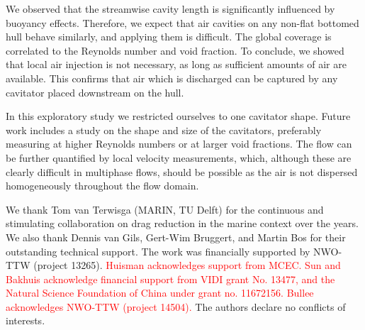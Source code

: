 \documentclass[aps,onecolumn,10pt, floatfix, superscriptaddress,longbibliography, pra]{revtex4-1}
\newcommand{\red}[1]{\textcolor{red}{#1}}
\begin{document}
We observed that the streamwise cavity length is significantly influenced by buoyancy effects. Therefore, we expect that air cavities on any non-flat bottomed hull behave similarly, and applying them is difficult. The global coverage is correlated to the Reynolds number and void fraction. To conclude, we showed that local air injection is not necessary, as long as sufficient amounts of air are available. This confirms that air which is discharged can be captured by any cavitator placed downstream on the hull.

In this exploratory study we restricted ourselves to one cavitator shape. Future work includes a study on the shape and size of the cavitators, preferably measuring at higher Reynolds numbers or at larger void fractions. The flow can be further quantified by local velocity measurements, which, although these are clearly difficult in multiphase flows, should be possible as the air is not dispersed homogeneously throughout the flow domain.

\begin{acknowledgments}
We thank Tom van Terwisga (MARIN, TU Delft) for the continuous and stimulating collaboration on drag reduction in the marine context over the years. We also thank Dennis van Gils, Gert-Wim Bruggert, and Martin Bos for their outstanding technical support. The work was financially supported by NWO-TTW (project 13265). \red{Huisman acknowledges support from MCEC. Sun and Bakhuis acknowledge financial support from VIDI grant No. 13477, and the Natural Science Foundation of China under grant no. 11672156. Bullee acknowledges NWO-TTW (project 14504).} The authors declare no conflicts of interests.
\end{acknowledgments}
\end{document}

